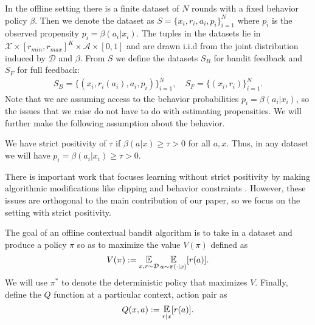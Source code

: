 In the offline setting there is a finite dataset of $ N $ rounds with a fixed behavior policy $ \beta$.  Then we denote the dataset as $ S = \{x_i, r_i, a_i, p_i\}_{i=1}^N$ where $ p_i $ is the observed propensity $ p_i = \beta(a_i|x_i)$. The tuples in the datasets lie in $ \mathcal{X} \times [r_{min},r_{max}]^K \times \mathcal{A} \times [0,1]$ and are drawn i.i.d from the joint distribution induced by $ \mathcal{D}$ and $ \beta$.
From $ S $ we define the datasets $ S_B$ for bandit feedback and $ S_F$ for full feedback:
\begin{align*}
    S_B = \{(x_i, r_i(a_i), a_i, p_i)\}_{i=1}^N, \quad S_F = \{(x_i, r_i)\}_{i=1}^N.
\end{align*}
Note that we are assuming access to the behavior probabilities $ p_i = \beta(a_i|x_i)$, so the issues that we raise do not have to do with estimating propensities.
We will further make the following assumption about the behavior.
\begin{assumption}\label{ass:positivity}
We have strict positivity of $ \tau $ if $ \beta(a|x) \geq \tau > 0$ for all $ a, x$. Thus, in any dataset we will have $ p_i = \beta(a_i|x_i) \geq \tau > 0$.
\end{assumption}
There is important work that focuses learning without strict positivity by making algorithmic modifications like clipping \citep{bottou2013counterfactual, strehl2010learning, swaminathan2015counterfactual} and behavior constraints \citep{fujimoto2018off, laroche2019safe}. However, these issues are orthogonal to the main contribution of our paper, so we focus on the setting with strict positivity.



The goal of an offline contextual bandit algorithm is to take in a dataset and produce a policy $ \pi$ so as to maximize the value $ V(\pi)$ defined as
\begin{align*}
    V(\pi) := \E_{x, r \sim \mathcal{D}}\E_{a \sim \pi(\cdot|x)} [r(a)].
\end{align*}
We will use $ \pi^*$ to denote the deterministic policy that maximizes $ V$.
Finally, define the $ Q $ function at a particular context, action pair as
\begin{align*}
    Q(x,a) := \E_{r|x}[r(a)].
\end{align*}


